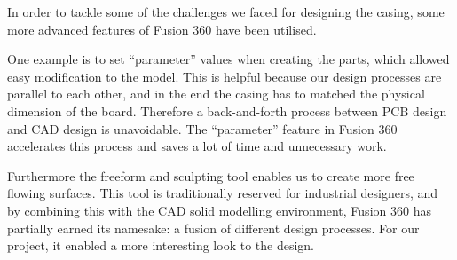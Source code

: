 In order to tackle some of the challenges we faced for designing the casing, some more advanced features of Fusion 360 have been utilised.

\noindent
One example is to set “parameter” values when creating the parts, which allowed easy modification to the model. This is helpful because our design processes are parallel to each other, and in the end the casing has to matched the physical dimension of the board. Therefore a back-and-forth process between PCB design and CAD design is unavoidable. The “parameter” feature in Fusion 360 accelerates this process and saves a lot of time and unnecessary work.

Furthermore the freeform and sculpting tool enables us to create more free flowing surfaces. This tool is traditionally reserved for industrial designers, and by combining this with the CAD solid modelling environment, Fusion 360 has partially earned its namesake: a fusion of different design processes. For our project, it enabled a more interesting look to the design.

\FloatBarrier
\vspace{1cm}


